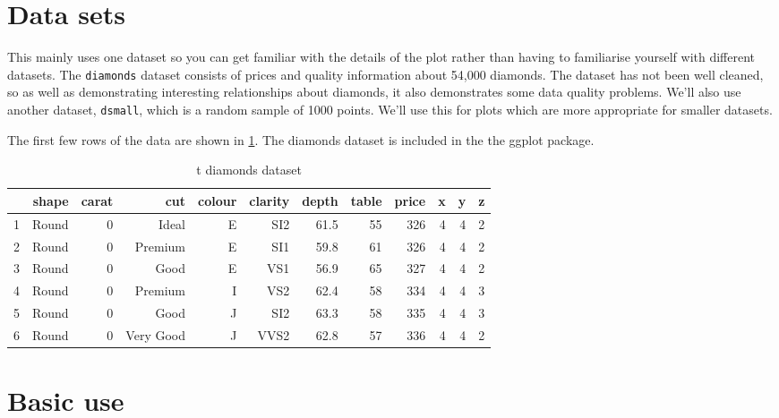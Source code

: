 \section{Data sets}\label{sec:data_sets}

This mainly uses one dataset so you can get familiar with the details of the plot rather than having to familiarise yourself with different datasets.  The {\tt diamonds} dataset consists of prices and quality information about 54,000 diamonds.  The dataset has not been well cleaned, so as well as demonstrating interesting relationships about diamonds, it also demonstrates some data quality problems.  We'll also use another dataset, {\tt dsmall}, which is a random sample of 1000 points.  We'll use this for plots which are more appropriate for smaller datasets.

The first few rows of the data are shown in \ref{tab:diamonds}.  The diamonds dataset is included in the the ggplot package.

\begin{table}[ht]
\begin{center}
\begin{tabular}{l|rrrrrrrrrrr}
\hline
 & shape & carat & cut & colour & clarity & depth & table & price & x & y & z \\
\hline
1 & Round & 0 & Ideal & E & SI2 & 61.5 & 55 & 326 & 4 & 4 & 2 \\
2 & Round & 0 & Premium & E & SI1 & 59.8 & 61 & 326 & 4 & 4 & 2 \\
3 & Round & 0 & Good & E & VS1 & 56.9 & 65 & 327 & 4 & 4 & 2 \\
4 & Round & 0 & Premium & I & VS2 & 62.4 & 58 & 334 & 4 & 4 & 3 \\
5 & Round & 0 & Good & J & SI2 & 63.3 & 58 & 335 & 4 & 4 & 3 \\
6 & Round & 0 & Very Good & J & VVS2 & 62.8 & 57 & 336 & 4 & 4 & 2 \\
\hline
\end{tabular}
\caption{{	t diamonds} dataset}
\label{tab:diamonds}
\end{center}
\end{table}

\section{Basic use}\label{sec:basic_use}


